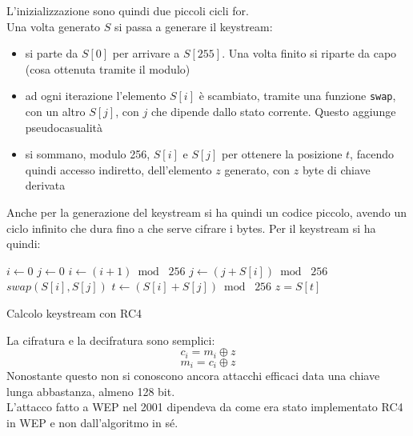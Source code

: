 \documentclass[a4paper,12pt, oneside]{book}
\begin{document}
L'inizializzazione sono quindi due piccoli cicli for.\\
Una volta generato $S$ si passa a generare il keystream:
\begin{itemize}
  \item si parte da $S[0]$ per arrivare a $S[255]$. Una volta finito si riparte
  da capo (cosa ottenuta tramite il modulo)
  \item ad ogni iterazione l'elemento $S[i]$ è scambiato, tramite una funzione
  \texttt{swap}, con un altro $S[j]$, con $j$ che dipende dallo stato
  corrente. Questo aggiunge pseudocasualità
  \item si sommano, modulo 256, $S[i]$ e $S[j]$ per ottenere la posizione $t$,
  facendo quindi accesso indiretto,
  dell'elemento $z$ generato, con $z$ byte di chiave derivata
\end{itemize}
Anche per la generazione del keystream si ha quindi un codice piccolo, avendo un
ciclo infinito che dura fino a che serve cifrare i bytes.  
\newpage
Per il keystream si ha quindi:
\begin{algorithm}[H]
  \begin{algorithmic}
    \State $i\gets 0$
    \State $j\gets 0$
    \While {$\top$}
    \State $i\gets (i+1)\bmod\,\,256$
    \State $j\gets (j+S[i])\bmod\,\,256$
    \State $swap(S[i],S[j])$
    \State $t\gets (S[i]+S[j])\bmod\,\,256$
    \State $z=S[t]$
    \EndWhile
  \end{algorithmic}
  \caption{Calcolo keystream con RC4}
\end{algorithm}
La cifratura e la decifratura sono semplici:
\[c_i=m_i\oplus z\]
\[m_i=c_i\oplus z\]
Nonostante questo non si conoscono ancora attacchi efficaci data una chiave
lunga abbastanza, almeno 128 bit.\\
L'attacco fatto a WEP nel 2001 dipendeva da come era stato implementato RC4 in
WEP e non dall'algoritmo in sé.
\end{document}
